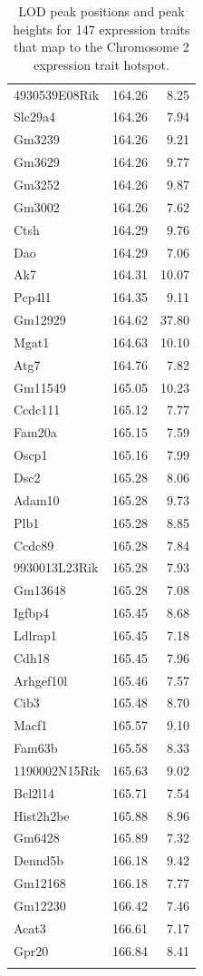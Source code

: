 \documentclass{article}
\begin{document}
\begin{longtable}{lrr}
  4930539E08Rik & 164.26 & 8.25 \\ 
  Slc29a4 & 164.26 & 7.94 \\ 
  Gm3239 & 164.26 & 9.21 \\ 
  Gm3629 & 164.26 & 9.77 \\ 
  Gm3252 & 164.26 & 9.87 \\ 
  Gm3002 & 164.26 & 7.62 \\ 
  Ctsh & 164.29 & 9.76 \\ 
  Dao & 164.29 & 7.06 \\ 
  Ak7 & 164.31 & 10.07 \\ 
  Pcp4l1 & 164.35 & 9.11 \\ 
  Gm12929 & 164.62 & 37.80 \\ 
  Mgat1 & 164.63 & 10.10 \\ 
  Atg7 & 164.76 & 7.82 \\ 
  Gm11549 & 165.05 & 10.23 \\ 
  Ccdc111 & 165.12 & 7.77 \\ 
  Fam20a & 165.15 & 7.59 \\ 
  Oscp1 & 165.16 & 7.99 \\ 
  Dsc2 & 165.28 & 8.06 \\ 
  Adam10 & 165.28 & 9.73 \\ 
  Plb1 & 165.28 & 8.85 \\ 
  Ccdc89 & 165.28 & 7.84 \\ 
  9930013L23Rik & 165.28 & 7.93 \\ 
  Gm13648 & 165.28 & 7.08 \\ 
  Igfbp4 & 165.45 & 8.68 \\ 
  Ldlrap1 & 165.45 & 7.18 \\ 
  Cdh18 & 165.45 & 7.96 \\ 
  Arhgef10l & 165.46 & 7.57 \\ 
  Cib3 & 165.48 & 8.70 \\ 
  Macf1 & 165.57 & 9.10 \\ 
  Fam63b & 165.58 & 8.33 \\ 
  1190002N15Rik & 165.63 & 9.02 \\ 
  Bcl2l14 & 165.71 & 7.54 \\ 
  Hist2h2be & 165.88 & 8.96 \\ 
  Gm6428 & 165.89 & 7.32 \\ 
  Dennd5b & 166.18 & 9.42 \\ 
  Gm12168 & 166.18 & 7.77 \\ 
  Gm12230 & 166.42 & 7.46 \\ 
  Acat3 & 166.61 & 7.17 \\ 
  Gpr20 & 166.84 & 8.41 \\ 
   \hline
  \caption{LOD peak positions and peak heights for 147 expression traits that map to the Chromosome 2 expression trait hotspot.}
  \label{tab:hot-annot}

\end{longtable}
\end{document}
